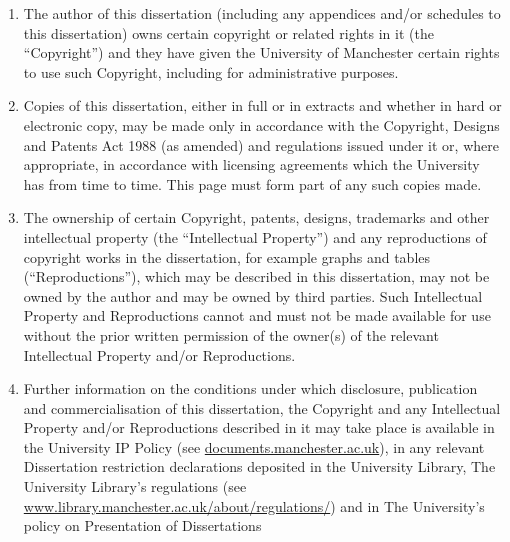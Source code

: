 \documentclass[
11pt, %
english, %
onehalfspacing, %
toctotoc, %
headsepline, %
twoside,
]{MastersDoctoralThesis} %
\begin{document}
\begin{copyrightstatement}

\addchaptertocentry{\copyrightname} %

\begin{enumerate}[label=(\roman*)]
\item The author of this dissertation (including any appendices and/or schedules to this dissertation) owns certain copyright or related rights in it (the “Copyright”) and they have given the University of Manchester certain rights to use such Copyright, including for administrative purposes.\\[0.3cm]
\item Copies of this dissertation, either in full or in extracts and whether in hard or electronic copy, may be made only in accordance with the Copyright, Designs and Patents Act 1988 (as amended) and regulations issued under it or, where appropriate, in accordance with licensing agreements which the University has from time to time. This page must form part of any such copies made.\\[0.3cm]
\item The ownership of certain Copyright, patents, designs, trademarks and other intellectual property (the “Intellectual Property”) and any reproductions of copyright works in the dissertation, for example graphs and tables (“Reproductions”), which may be described in this dissertation, may not be owned by the author and may be owned by third parties. Such Intellectual Property and Reproductions cannot and must not be made available for use without the prior written permission of the owner(s) of the relevant Intellectual Property and/or Reproductions.\\[0.3cm]
\item Further information on the conditions under which disclosure,
publication and commercialisation of this dissertation, the Copyright
and any Intellectual Property and/or Reproductions described in
it may take place is available in the University IP Policy (see
\href{http://documents.manchester.ac.uk/DocuInfo.aspx?DocID=24420}{documents.manchester.ac.uk}), in any relevant Dissertation restriction declarations deposited in the
University Library, The University Library’s regulations (see
\href{http://www.library.manchester.ac.uk/about/regulations/}{www.library.manchester.ac.uk/about/regulations/}) and in
The University’s policy on Presentation of Dissertations
\end{enumerate}
\end{copyrightstatement}
\end{document}
